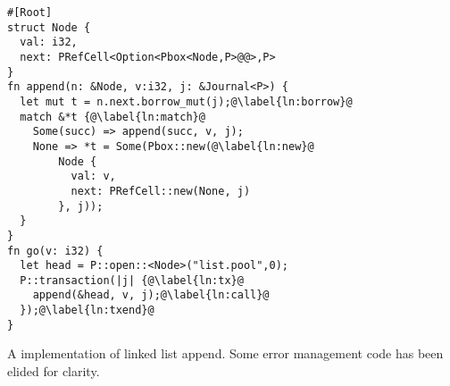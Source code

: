 \begin{lstfloat}
  \begin{lstlisting}[escapechar=\@]
#[Root]
struct Node {
  val: i32,
  next: PRefCell<Option<Pbox<Node,P>@@>,P>
}
fn append(n: &Node, v:i32, j: &Journal<P>) {
  let mut t = n.next.borrow_mut(j);@\label{ln:borrow}@
  match &*t {@\label{ln:match}@
    Some(succ) => append(succ, v, j);
    None => *t = Some(Pbox::new(@\label{ln:new}@
        Node {
          val: v,
          next: PRefCell::new(None, j)
        }, j));
  }
}
fn go(v: i32) {
  let head = P::open::<Node>("list.pool",0);
  P::transaction(|j| {@\label{ln:tx}@
    append(&head, v, j);@\label{ln:call}@
  });@\label{ln:txend}@
}
\end{lstlisting}
\caption{A \this{} implementation of linked list append.  Some error management code has been elided for clarity.}
\label{lst:example}
\end{lstfloat}

